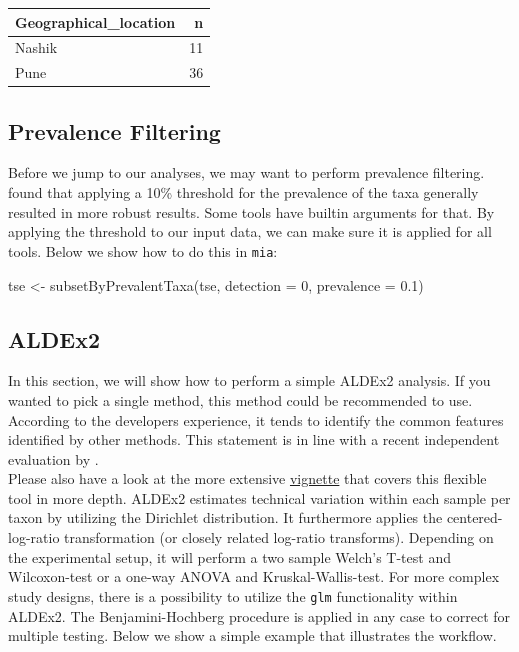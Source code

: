 \documentclass[
]{book}
\newenvironment{Shaded}{\begin{snugshade}}{\end{snugshade}}
\newcommand{\AttributeTok}[1]{\textcolor[rgb]{0.77,0.63,0.00}{#1}}
\newcommand{\DecValTok}[1]{\textcolor[rgb]{0.00,0.00,0.81}{#1}}
\newcommand{\FloatTok}[1]{\textcolor[rgb]{0.00,0.00,0.81}{#1}}
\newcommand{\FunctionTok}[1]{\textcolor[rgb]{0.00,0.00,0.00}{#1}}
\newcommand{\NormalTok}[1]{#1}
\newcommand{\OtherTok}[1]{\textcolor[rgb]{0.56,0.35,0.01}{#1}}
\begin{document}
\begin{tabular}{l|r}
\hline
Geographical\_location & n\\
\hline
Nashik & 11\\
\hline
Pune & 36\\
\hline
\end{tabular}

\hypertarget{prevalence-filtering}{%
\subsection{Prevalence Filtering}\label{prevalence-filtering}}

Before we jump to our analyses, we may want to perform prevalence filtering.
\citet{Nearing2022} found that applying a 10\% threshold
for the prevalence of the taxa generally resulted in more robust results.
Some tools have builtin arguments for that. By applying the threshold to our
input data, we can make sure it is applied for all tools. Below we show how to
do this in \texttt{mia}:

\begin{Shaded}
\begin{Highlighting}[]
\NormalTok{tse }\OtherTok{\textless{}{-}} \FunctionTok{subsetByPrevalentTaxa}\NormalTok{(tse, }\AttributeTok{detection =} \DecValTok{0}\NormalTok{, }\AttributeTok{prevalence =} \FloatTok{0.1}\NormalTok{)}
\end{Highlighting}
\end{Shaded}

\hypertarget{aldex2}{%
\subsection{ALDEx2}\label{aldex2}}

In this section, we will show how to perform a simple ALDEx2 analysis.
If you wanted to pick a single method, this method could be recommended to use.
According to the developers experience, it tends to identify the common
features identified by other methods. This statement is in line with a recent
independent evaluation by \citet{Nearing2022}.\\
Please also have a look at the more extensive
\href{https://bioconductor.org/packages/release/bioc/vignettes/ALDEx2/inst/doc/ALDEx2_vignette.html}{vignette}
that covers this flexible tool in more depth. ALDEx2 estimates technical
variation within each sample per taxon by utilizing the Dirichlet distribution.
It furthermore applies the centered-log-ratio transformation (or closely
related log-ratio transforms). Depending on the experimental setup, it will
perform a two sample Welch's T-test and Wilcoxon-test or a one-way ANOVA and
Kruskal-Wallis-test. For more complex study designs, there is a possibility to
utilize the \texttt{glm} functionality within ALDEx2. The Benjamini-Hochberg procedure
is applied in any case to correct for multiple testing. Below we show a simple
example that illustrates the workflow.
\end{document}
